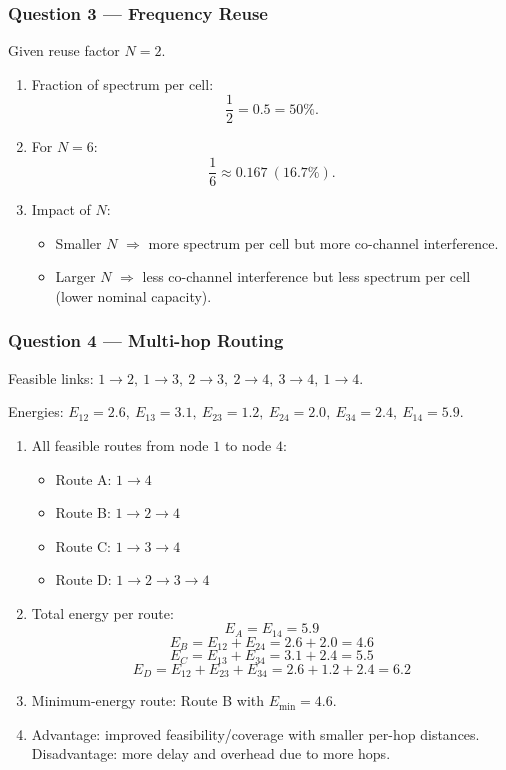 \documentclass[11pt,a4paper]{article}
\begin{document}
\subsubsection*{Question 3 --- Frequency Reuse}
Given reuse factor $N=2$.

\begin{enumerate}[label=\alph*.]
    \item Fraction of spectrum per cell:
    \[
    \frac{1}{2}=0.5=50\%.
    \]
    \item For $N=6$:
    \[
    \frac{1}{6}\approx 0.167\ (16.7\%).
    \]
    \item Impact of $N$:
    \begin{itemize}
        \item Smaller $N$ $\Rightarrow$ more spectrum per cell but more co-channel interference.
        \item Larger $N$ $\Rightarrow$ less co-channel interference but less spectrum per cell (lower nominal capacity).
    \end{itemize}
    
\end{enumerate}

\subsubsection*{Question 4 --- Multi-hop Routing}
Feasible links: $1\to 2,\ 1\to 3,\ 2\to 3,\ 2\to 4,\ 3\to 4,\ 1\to 4$.

Energies: $E_{12}=2.6,\ E_{13}=3.1,\ E_{23}=1.2,\ E_{24}=2.0,\ E_{34}=2.4,\ E_{14}=5.9$.

\begin{enumerate}[label=\alph*.]
    \item All feasible routes from node $1$ to node $4$:
    \begin{itemize}
        \item Route A: $1\to 4$
        \item Route B: $1\to 2\to 4$
        \item Route C: $1\to 3\to 4$
        \item Route D: $1\to 2\to 3\to 4$
    \end{itemize}
    \item Total energy per route:
    \[
    E_A=E_{14}=5.9
    \]
    \[
    E_B=E_{12}+E_{24}=2.6+2.0=4.6
    \]
    \[
    E_C=E_{13}+E_{34}=3.1+2.4=5.5
    \]
    \[
    E_D=E_{12}+E_{23}+E_{34}=2.6+1.2+2.4=6.2
    \]
    \item Minimum-energy route: Route B with $E_{\min}=4.6$.
    \item Advantage: improved feasibility/coverage with smaller per-hop distances. Disadvantage: more delay and overhead due to more hops.
\end{enumerate}
\end{document}

